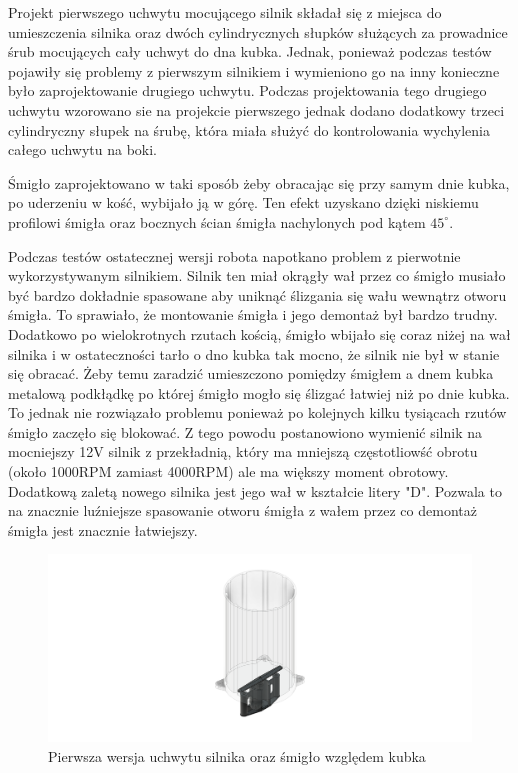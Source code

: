 Projekt pierwszego uchwytu mocującego silnik składał się z miejsca do umieszczenia silnika oraz dwóch cylindrycznych słupków służących za prowadnice
śrub mocujących cały uchwyt do dna kubka. Jednak, ponieważ podczas testów pojawiły się problemy z pierwszym silnikiem i wymieniono go na inny konieczne
było zaprojektowanie drugiego uchwytu. Podczas projektowania tego drugiego uchwytu wzorowano sie na projekcie pierwszego jednak dodano dodatkowy trzeci
cylindryczny słupek na śrubę, która miała służyć do kontrolowania wychylenia całego uchwytu na boki. 

Śmigło zaprojektowano w taki sposób żeby obracając się przy samym dnie kubka, po uderzeniu w kość, wybijało ją w górę. Ten efekt uzyskano
dzięki niskiemu profilowi śmigła oraz bocznych ścian śmigła nachylonych pod kątem $45^{\circ}$.

Podczas testów ostatecznej wersji robota napotkano problem z pierwotnie wykorzystywanym silnikiem. Silnik ten miał okrągły wał przez co śmigło musiało
być bardzo dokładnie spasowane aby uniknąć ślizgania się wału wewnątrz otworu śmigła. To sprawiało, że montowanie śmigła i jego demontaż był bardzo trudny. Dodatkowo po wielokrotnych rzutach kością, śmigło
wbijało się coraz niżej na wał silnika i w ostateczności tarło o dno kubka tak mocno, że silnik nie był w stanie się obracać. 
Żeby temu zaradzić umieszczono pomiędzy śmigłem a dnem kubka metalową podkłądkę po której śmigło mogło się ślizgać łatwiej niż po dnie kubka. To
jednak nie rozwiązało problemu ponieważ po kolejnych kilku tysiącach rzutów śmigło zaczęło się blokować. 
Z tego powodu postanowiono wymienić silnik na mocniejszy 12V silnik z przekładnią, który ma mniejszą częstotliowść obrotu (około 1000RPM zamiast 4000RPM) ale ma większy moment obrotowy.
Dodatkową zaletą nowego silnika jest jego wał w kształcie litery "D". Pozwala to na znacznie luźniejsze spasowanie otworu śmigła z wałem przez co 
demontaż śmigła jest znacznie łatwiejszy.

\begin{figure}[H]
    \centering
    \includegraphics[width=0.95\linewidth]{chapters/03-praca-wlasna/figures/uchwyt_v1.png}
    \caption{\label{fig:uchwyt_v1}Pierwsza wersja uchwytu silnika oraz śmigło względem kubka}
\end{figure}

